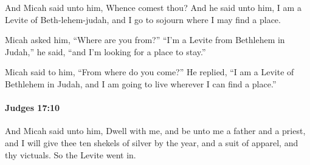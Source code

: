 			\begin{versebox}
					\item[BHS] 
					\item[ASV] And Micah said unto him, Whence comest thou? And he said unto him, I am a Levite of Beth-lehem-judah, and I go to sojourn where I may find a place.
					\item[NIV] Micah asked him, “Where are you from?” “I’m a Levite from Bethlehem in Judah,” he said, “and I’m looking for a place to stay.”
					\item[NRSV] Micah said to him, “From where do you come?” He replied, “I am a Levite of Bethlehem in Judah, and I am going to live wherever I can find a place.”
			\end{versebox}

		\paragraph{Judges 17:10} %
			\label{JUDGES-17-10}

			And Micah said unto him, Dwell with me, and be unto me a father and a priest, and I will give thee ten shekels of silver by the year, and a suit of apparel, and thy victuals. So the Levite went in.

